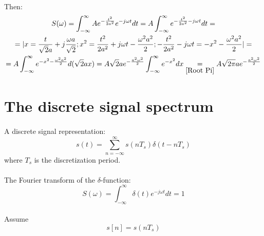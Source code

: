 \documentclass[14pt]{article}
\begin{document}
\paragraph{}
Then:
\begin{multline}
	S(\omega)
	=
	\int_{-\infty}^{\infty} A e^{-\frac{t^2}{2 a^2}} 
		e^{-j\omega t} {d}t 
	=
	A \int_{-\infty}^{\infty} e^{-\frac{t^2}{2 a^2} -j\omega t} {d}t 
	=\\=
	|x = \frac{t}{\sqrt{2}a}+j\frac{\omega a}{\sqrt{2}};
	x^2 = \frac{t^2}{2 a^2} + j \omega t - \frac{\omega^2 a^2}{2};
	-\frac{t^2}{2 a^2} -j\omega t = -x^2 - \frac{\omega^2 a^2}{2}|
	=\\=
	A \int_{-\infty}^{\infty} e^{-x^2 - \frac{\omega^2 a^2}{2}}
		{d}(\sqrt{2} a x) 
	=
	A \sqrt{2} a e^{-\frac{a^2 \omega^2}{2}} 		
		\int_{-\infty}^{\infty}  e^{-x^2} {d}x
	\underset{\eqref{Root Pi}}{=}
	A \sqrt{2 \pi} a e^{-\frac{a^2 \omega^2}{2}}
\end{multline}

\section{The discrete signal spectrum}

\paragraph{}
A discrete signal representation:
\begin{equation}
	s(t)
	=
	\sum_{n = -\infty}^{\infty} s(n T_s) \delta(t - n T_s)
\end{equation}
where $ T_s $ is the discretization period.

\paragraph{}
The Fourier transform of the $ \delta $-function:
\begin{equation} \label{Delta}
	S(\omega)
	=
	\int_{-\infty}^\infty \delta(t) e^{-j \omega t} {d}t
	=
	1
\end{equation}

\paragraph{}
Assume
\begin{equation} \label{Discrete}
	s[n]
	=
	s(n T_s)
\end{equation}
\end{document}
